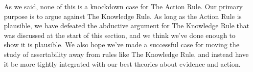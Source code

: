 As we said, none of this is a knockdown case for The Action Rule. Our primary purpose is to argue against The Knowledge Rule. As long as the Action Rule is plausible, we have defeated the abductive argument for The Knowledge Rule that was discussed at the start of this section, and we think we've done enough to show it is plausible. We also hope we've made a successful case for moving the study of assertability away from rules like The Knowledge Rule, and instead have it be more tightly integrated with our best theories about evidence and action.

%
%
%
%
%
%
%
%
%
%
%
%
%
%
%
%
%
%
%
%
%
%
%
%
%
%
%
%
%
%
%


